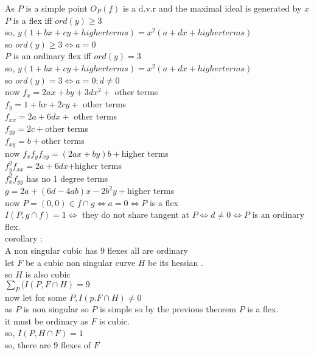 \documentclass[11pt]{article}
\begin{document}
As $P$ is a simple point $O_P(f)$ is a d.v.r and the maximal ideal is generated by $x$\\
$P$ is a flex iff $ord(y)\geq 3$\\
so, $y(1+bx+cy+higher terms)=x^2(a+dx+higher terms)$\\
so $ord(y)\geq 3\iff a=0$\\
$P$ is an ordinary flex iff $ord(y)= 3$\\
so, $y(1+bx+cy+higher terms)=x^2(a+dx+higher terms)$\\
so $ord(y)= 3\iff a=0;d\neq 0$\\

now $f_x=2ax+by+3dx^2+$ other terms\\
$f_y=1+bx+2cy+$ other terms\\ 
$f_{xx}=2a+6dx+$ other terms\\
$f_{yy}=2c+$other terms\\
$f_{xy}=b+$other terms\\
now $f_xf_yf_{xy}=(2ax+by)b+$higher terms\\
$f_y^2f_{xx}=2a+6dx$+higher terms\\
$f_x^2f_{yy}$ has no 1 degree terms\\
$g=2a+(6d-4ab)x-2b^2 y+$higher terms\\
now $P=(0,0)\in f\cap g \iff a=0 \iff P$ is a flex\\
$I(P,g\cap f)=1\iff $ they do not share tangent at $P\iff d\neq 0\iff P$ is an ordinary flex.\\
corollary :\\
A non singular cubic has 9 flexes all are ordinary\\
let $F$ be a cubic non singular curve $H$ be its hessian .\\
so $H$ is also cubic \\
$\sum_P(I(P,F\cap H)=9$\\
now let for some $P,I(p.F\cap H)\neq 0$\\
as $P$ is non singular so $P$ is simple so by the previous theorem $P$ is a flex.\\
it must be ordinary as $F$ is cubic.\\
so, $I(P,H\cap F)=1$\\
so, there are 9 flexes of $F$\\
\end{document}
